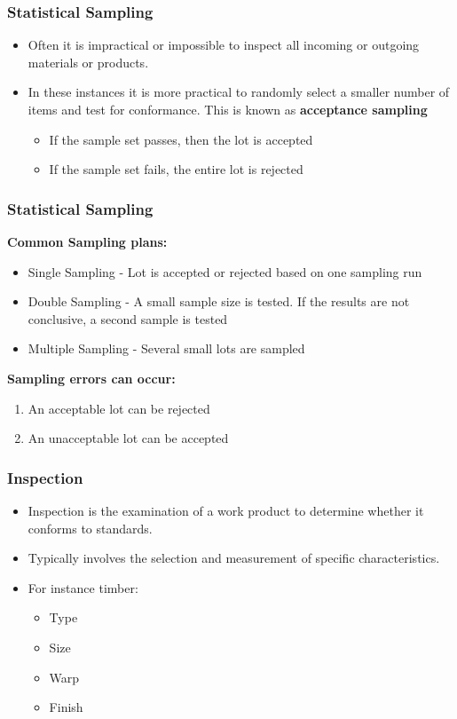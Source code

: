\begin{frame}
\frametitle{Statistical Sampling}
\begin{itemize}
	\item Often it is impractical or impossible to inspect all incoming or outgoing materials or products.
	\item In these instances it is more practical to randomly select a smaller number of items and test for conformance.  This is known as \textbf{acceptance sampling}
	\begin{itemize}
		\item If the sample set passes, then the lot is accepted\\
		\item If the sample set fails, the entire lot is rejected\\
	\end{itemize}
\end{itemize}
\end{frame}




\begin{frame}
\frametitle{Statistical Sampling}
\textbf{Common Sampling plans:}\\
\begin{itemize}
	\item Single Sampling - Lot is accepted or rejected based on one sampling run
	\item Double Sampling - A small sample size is tested.  If the results are not conclusive, a second sample is tested
	\item Multiple Sampling - Several small lots are sampled
\end{itemize}
\textbf{Sampling errors can occur:}
\begin{enumerate}
	\item An acceptable lot can be rejected
	\item An unacceptable lot can be accepted
\end{enumerate}
\end{frame}




\begin{frame}
\frametitle{Inspection}
\begin{itemize}
	\item Inspection is the examination of a work product to determine whether it conforms to standards.
	\item Typically involves the selection and measurement of specific characteristics.
	\item For instance timber:
		\begin{itemize}	
			\item Type
			\item Size
			\item Warp
			\item Finish
		\end{itemize}
\end{itemize}
\end{frame}




